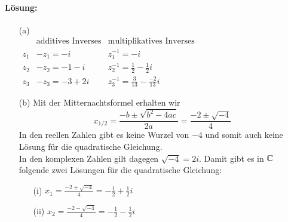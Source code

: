 \documentclass[
				a4paper,
				10pt
			]
			{scrartcl}
\begin{document}
\paragraph{L\"osung:}
\begin{itemize}
\item[(a)]
\quad\\
$
\begin{array}{l|l|l}
&\text{additives Inverses} & \text{multiplikatives Inverses}\\\hline\hline
z_1&-z_1=-i & z_1^{-1}=-i \\\hline
z_2&-z_2=-1-i & z_2^{-1}=\frac{1}{2} - \frac{1}{2}i  \\\hline
z_3&-z_3=-3+2i & z_3^{-1}=\frac{3}{13}-\frac{-2}{13}i
\end{array}
$
\quad\\
\item[(b)]
Mit der Mitternachtsformel erhalten wir
$$
x_{1/2}=\frac{-b\pm \sqrt{b^2-4ac}}{2a}=\frac{-2\pm \sqrt{-4}}{4}
$$
In den reellen Zahlen gibt es keine Wurzel von $-4$ und somit auch keine L\"osung f\"ur die quadratische Gleichung.\\
In den komplexen Zahlen gilt dagegen $\sqrt{-4}=2i$. Damit gibt es in $\mathbb{C}$ folgende zwei L\"osungen f\"ur die quadratische Gleichung:
\begin{itemize}
\item[(i)] $x_1=\frac{-2+ \sqrt{-4}}{4}=-\frac{1}{2} + \frac{1}{2}i$
\item[(ii)] $x_2=\frac{-2- \sqrt{-4}}{4}=-\frac{1}{2} - \frac{1}{2}i$
\end{itemize}

\end{itemize}
\end{document}
